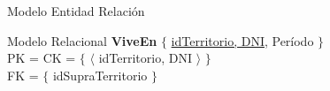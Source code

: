 \begin{section}{Modelo Entidad Relaci\'on}
\begin{subsection}{Modelo Relacional}
\textbf{ViveEn} $ \lbrace $ \underline{idTerritorio, DNI}, Per\'iodo $ \rbrace $ \\
PK = CK = $ \lbrace $ $ \langle $ idTerritorio, DNI $ \rangle $ $ \rbrace $ \\
FK = $ \lbrace $ idSupraTerritorio $ \rbrace $\\


\end{subsection}

\end{section}
